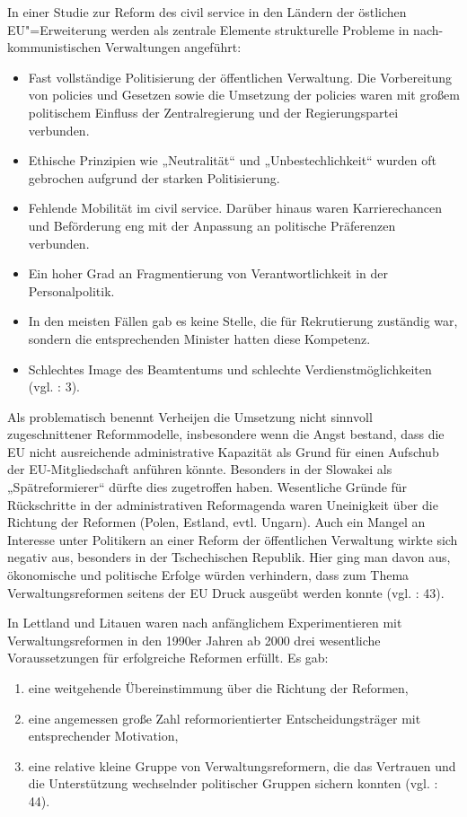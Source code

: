 In einer Studie zur Reform des civil service in den Ländern der östlichen EU"=Erweiterung werden als zentrale Elemente strukturelle Probleme in nach-kommunistischen Verwaltungen angeführt: 
\begin{itemize} \itemsep1pt \parskip0pt 
\item Fast vollständige Politisierung der öffentlichen Verwaltung. Die Vorbereitung von policies und Gesetzen sowie die Umsetzung der policies waren mit großem politischem Einfluss der Zentralregierung und der Regierungspartei verbunden. 
\item Ethische Prinzipien wie „Neutralität“ und „Unbestechlichkeit“ wurden oft gebrochen aufgrund der starken Politisierung.
\item Fehlende Mobilität im civil service. Darüber hinaus waren Karrierechancen und Beförderung eng mit der Anpassung an politische Präferenzen verbunden.
\item Ein hoher Grad an Fragmentierung von Verantwortlichkeit in der Personalpolitik. 
\item In den meisten Fällen gab es keine Stelle, die für Rekrutierung zuständig war, sondern die entsprechenden Minister hatten diese Kompetenz.
\item Schlechtes Image des Beamtentums und schlechte Verdienstmöglichkeiten
(vgl. \cite{bosdem} : 3). 
\end{itemize}

Als problematisch benennt Verheijen die Umsetzung nicht sinnvoll zugeschnittener Reformmodelle, insbesondere wenn die Angst bestand, dass die EU nicht ausreichende administrative Kapazität als Grund für einen Aufschub der EU-Mitgliedschaft anführen könnte. Besonders in der Slowakei als „Spätreformierer“ dürfte dies zugetroffen haben. Wesentliche Gründe für Rückschritte in der administrativen Reformagenda waren Uneinigkeit über die Richtung der Reformen (Polen, Estland, evtl. Ungarn). Auch ein Mangel an Interesse unter Politikern an einer Reform der öffentlichen Verwaltung wirkte sich negativ aus, besonders in der Tschechischen Republik. Hier ging man davon aus, ökonomische und politische Erfolge würden verhindern, dass zum Thema Verwaltungsreformen seitens der EU Druck ausgeübt werden konnte (vgl. \cite{verheijen06} : 43). \par

In Lettland und Litauen waren nach anfänglichem Experimentieren mit Verwaltungsreformen in den 1990er Jahren ab 2000 drei wesentliche Voraussetzungen für erfolgreiche Reformen erfüllt. Es gab:
\begin{enumerate} \itemsep1pt \parskip0pt 
\item  eine weitgehende Übereinstimmung über die Richtung der Reformen,
\item eine angemessen große Zahl reformorientierter Entscheidungsträger mit entsprechender Motivation, 
\item eine relative kleine Gruppe von Verwaltungsreformern, die das Vertrauen und die Unterstützung wechselnder politischer Gruppen sichern konnten (vgl.  \cite{verheijen06} : 44).
\end{enumerate}

